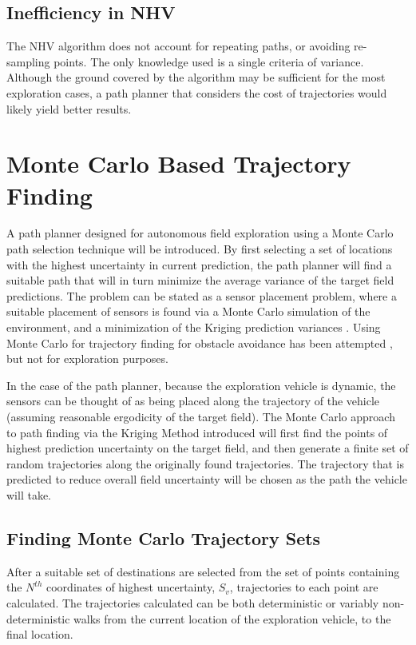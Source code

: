 \subsection{Inefficiency in NHV}
The NHV algorithm does not account for repeating paths, or avoiding re-sampling points. The only knowledge used is a single criteria of variance. Although the ground covered by the algorithm may be sufficient for the most exploration cases, a path planner that considers the cost of trajectories would likely yield better results.

\section{Monte Carlo Based Trajectory Finding}
A path planner designed for autonomous field exploration using a Monte Carlo path selection technique will be introduced. By first selecting a set of locations with the highest uncertainty in current prediction, the path planner will find a suitable path that will in turn minimize the average variance of the target field predictions. The problem can be stated as a sensor placement problem, where a suitable placement of sensors is found via a Monte Carlo simulation of the environment, and a minimization of the Kriging prediction variances \cite{kriging:sensorplacement}. Using Monte Carlo for trajectory finding for obstacle avoidance has been attempted \cite{janson:mcmp}, but not for exploration purposes.

In the case of the path planner, because the exploration vehicle is dynamic, the sensors can be thought of as being placed along the trajectory of the vehicle (assuming reasonable ergodicity of the target field). The Monte Carlo approach to path finding via the Kriging Method introduced will first find the points of highest prediction uncertainty on the target field, and then generate a finite set of random trajectories along the originally found trajectories. The trajectory that is predicted to reduce overall field uncertainty will be chosen as the path the vehicle will take.

\subsection{Finding Monte Carlo Trajectory Sets} \label{sec:mctrajsets}
After a suitable set of destinations are selected from the set of points containing the $N^{th}$ coordinates of highest uncertainty, $S_{v}$, trajectories to each point are calculated. The trajectories calculated can be both deterministic or variably non-deterministic walks from the current location of the exploration vehicle, to the final location.

